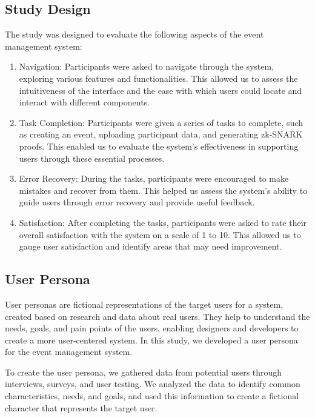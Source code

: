 \subsection{Study Design}
The study was designed to evaluate the following aspects of the event management system:

\begin{enumerate}
  \item Navigation: Participants were asked to navigate through the system, exploring various features and functionalities. This allowed us to assess the intuitiveness of the interface and the ease with which users could locate and interact with different components.
  \item Task Completion: Participants were given a series of tasks to complete, such as creating an event, uploading participant data, and generating zk-SNARK proofs. This enabled us to evaluate the system's effectiveness in supporting users through these essential processes.
  \item Error Recovery: During the tasks, participants were encouraged to make mistakes and recover from them. This helped us assess the system's ability to guide users through error recovery and provide useful feedback.
  \item Satisfaction: After completing the tasks, participants were asked to rate their overall satisfaction with the system on a scale of 1 to 10. This allowed us to gauge user satisfaction and identify areas that may need improvement.
\end{enumerate}

\subsection{User Persona}
User personas are fictional representations of the target users for a system, created based on research and data about real users. They help to understand the needs, goals, and pain points of the users, enabling designers and developers to create a more user-centered system. In this study, we developed a user persona for the event management system.

To create the user persona, we gathered data from potential users through interviews, surveys, and user testing. We analyzed the data to identify common characteristics, needs, and goals, and used this information to create a fictional character that represents the target user.

